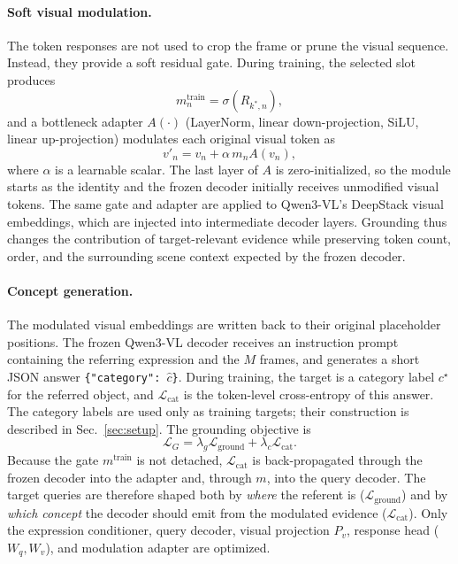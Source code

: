 \paragraph{Soft visual modulation.}
The token responses are not used to crop the frame or prune the visual sequence. Instead, they provide a soft residual gate. During training, the selected slot produces
\begin{equation}
 m_n^{\mathrm{train}}=\sigma(R_{k^{*},n}),
\end{equation}
and a bottleneck adapter $A(\cdot)$ (LayerNorm, linear down-projection, SiLU, linear up-projection) modulates each original visual token as
\begin{equation}
 v'_n
 =
 v_n+\alpha\,m_n A(v_n),
\label{eq:soft_modulation}
\end{equation}
where $\alpha$ is a learnable scalar. The last layer of $A$ is zero-initialized, so the module starts as the identity and the frozen decoder initially receives unmodified visual tokens. The same gate and adapter are applied to Qwen3-VL's DeepStack visual embeddings, which are injected into intermediate decoder layers. Grounding thus changes the contribution of target-relevant evidence while preserving token count, order, and the surrounding scene context expected by the frozen decoder.

\paragraph{Concept generation.}
The modulated visual embeddings are written back to their original placeholder positions. The frozen Qwen3-VL decoder receives an instruction prompt containing the referring expression and the $M$ frames, and generates a short JSON answer \texttt{\{"category": $\hat c$\}}. During training, the target is a category label $c^{\star}$ for the referred object, and $\mathcal{L}_{\mathrm{cat}}$ is the token-level cross-entropy of this answer. The category labels are used only as training targets; their construction is described in Sec.~\ref{sec:setup}. The grounding objective is
\begin{equation}
\mathcal{L}_{G}
=
\lambda_g\mathcal{L}_{\mathrm{ground}}
+
\lambda_c\mathcal{L}_{\mathrm{cat}}.
\end{equation}
Because the gate $m^{\mathrm{train}}$ is not detached, $\mathcal{L}_{\mathrm{cat}}$ is back-propagated through the frozen decoder into the adapter and, through $m$, into the query decoder. The target queries are therefore shaped both by \emph{where} the referent is ($\mathcal{L}_{\mathrm{ground}}$) and by \emph{which concept} the decoder should emit from the modulated evidence ($\mathcal{L}_{\mathrm{cat}}$). Only the expression conditioner, query decoder, visual projection $P_v$, response head ($W_q,W_v$), and modulation adapter are optimized.

